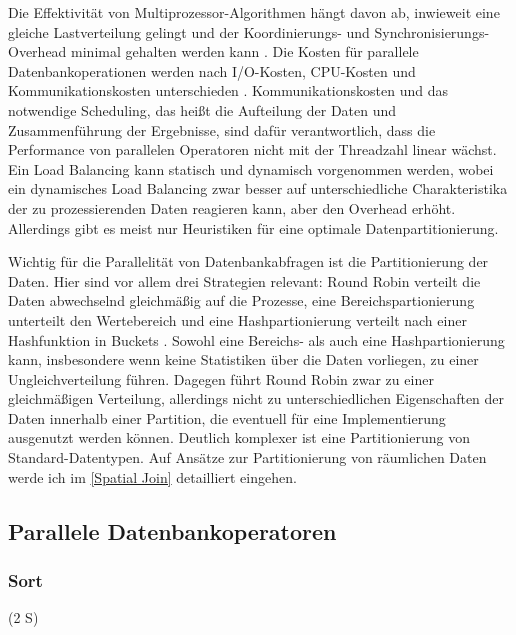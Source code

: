 \documentclass[a4paper,12pt,twoside]{article}
\begin{document}
Die Effektivität von Multiprozessor-Algorithmen hängt davon ab, inwieweit eine gleiche Lastverteilung gelingt und der Koordinierungs- und Synchronisierungs-Overhead minimal gehalten werden kann {\autocite{Lakshmi1990}}. Die Kosten für parallele Datenbankoperationen werden nach I/O-Kosten, CPU-Kosten und Kommunikationskosten unterschieden {\autocite [S. 23]{Yu1998}}. Kommunikationskosten und das notwendige Scheduling, das heißt die Aufteilung der Daten und Zusammenführung der Ergebnisse, sind dafür verantwortlich, dass die Performance von parallelen Operatoren nicht mit der Threadzahl linear wächst. Ein Load Balancing kann statisch und dynamisch vorgenommen werden, wobei ein dynamisches Load Balancing zwar besser auf unterschiedliche Charakteristika der zu prozessierenden Daten reagieren kann, aber den Overhead erhöht. Allerdings gibt es meist nur Heuristiken für eine optimale Datenpartitionierung.

Wichtig für die Parallelität von Datenbankabfragen ist die Partitionierung der Daten. Hier sind vor allem drei Strategien relevant: Round Robin verteilt die Daten abwechselnd gleichmäßig auf die Prozesse, eine Bereichspartionierung unterteilt den Wertebereich und eine Hashpartionierung verteilt nach einer Hashfunktion in Buckets {\autocite{Yu1998}}. Sowohl eine Bereichs- als auch eine Hashpartionierung kann, insbesondere wenn keine Statistiken über die Daten vorliegen, zu einer Ungleichverteilung führen. Dagegen führt Round Robin zwar zu einer gleichmäßigen Verteilung, allerdings nicht zu unterschiedlichen Eigenschaften der Daten innerhalb einer Partition, die eventuell für eine Implementierung ausgenutzt werden können. Deutlich komplexer ist eine Partitionierung von Standard-Datentypen. Auf Ansätze zur Partitionierung von räumlichen Daten werde ich im \autoref{Spatial Join} detailliert eingehen. 


\subsection{Parallele Datenbankoperatoren}

\subsubsection{Sort} (2 S)
\label{Sort} 
\end{document}

